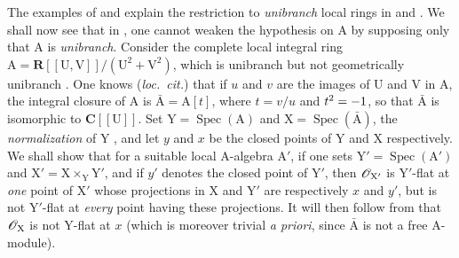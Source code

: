 \begin{env}[11.7.5]
\label{IV.11.7.5}
The examples of  and  explain the restriction to \emph{unibranch} local rings in  and .
We shall now see that in , one cannot weaken the hypothesis on $\mathrm{A}$ by supposing only that $\mathrm{A}$ is \emph{unibranch}.
Consider the complete local integral ring $\mathrm{A}=\mathbf{R}[[\mathrm{U},\mathrm{V}]]/(\mathrm{U}^2+\mathrm{V}^2)$, which is unibranch but not geometrically unibranch .
One knows (\emph{loc.\ cit.}) that if $u$ and $v$ are the images of $\mathrm{U}$ and $\mathrm{V}$ in $\mathrm{A}$, the integral closure of $\mathrm{A}$ is $\bar{\mathrm{A}}=\mathrm{A}[t]$, where $t=v/u$ and $t^2=- 1$, so that $\bar{\mathrm{A}}$ is isomorphic to $\mathbf{C}[[\mathrm{U}]]$.
Set $\mathrm{Y}=\operatorname{Spec}(\mathrm{A})$ and $\mathrm{X}=\operatorname{Spec}(\bar{\mathrm{A}})$, the \emph{normalization} of $\mathrm{Y}$ , and let $y$ and $x$ be the closed points of $\mathrm{Y}$ and $\mathrm{X}$ respectively.
We shall show that for a suitable local $\mathrm{A}$-algebra $\mathrm{A}'$, if one sets $\mathrm{Y}'=\operatorname{Spec}(\mathrm{A}')$ and $\mathrm{X}'=\mathrm{X}\times_\mathrm{Y}\mathrm{Y}'$, and if $y'$ denotes the closed point of $\mathrm{Y}'$, then $\mathscr{O}_{\mathrm{X}'}$ is $\mathrm{Y}'$-flat at \emph{one} point of $\mathrm{X}'$ whose projections in $\mathrm{X}$ and $\mathrm{Y}'$ are respectively $x$ and $y'$, but is not $\mathrm{Y}'$-flat at \emph{every} point having these projections.
It will then follow from  that $\mathscr{O}_\mathrm{X}$ is not $\mathrm{Y}$-flat at $x$ (which is moreover trivial \emph{a priori}, since $\bar{\mathrm{A}}$ is not a free $\mathrm{A}$-module).


\end{env}

